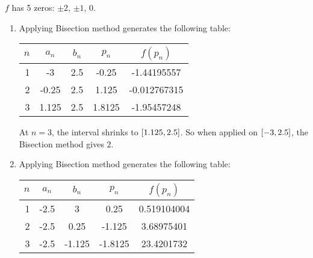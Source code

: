 \documentclass[../../Assignments.tex]{subfiles}
\begin{document}
\begin{solution}
    \(f\) has 5 zeros: \(\pm 2\), \(\pm 1\), \(0\).

    \begin{enumerate}[label = (\alph*)]
        \item Applying Bisection method generates the following table:

            \begin{table}[H]
                \centering
                \begin{tabular}{r S[table-format=-1.3] S[table-format=1.1] S[table-format=-1.4] S[table-format=-1.9]}
                    \toprule
                    \(n\)  &   {\(a_n\)}   &   {\(b_n\)}   &   {\(p_n\)}   &  {\(f(p_n)\)}  \\
                      &  -3           &  2.5          &  -0.25        &  -1.44195557   \\
                        2  &  -0.25        &  2.5          &   1.125       &  -0.012767315  \\
                        3  &   1.125       &  2.5          &   1.8125      &  -1.95457248   \\
                    \bottomrule
                \end{tabular}
            \end{table}

            At \(n = 3\), the interval shrinks to
            \(\interval{\num{1.125}}{\num{2.5}}\). So when applied on
            \(\interval{-3}{\num{2.5}}\), the Bisection method gives \(2\).

        \item Applying Bisection method generates the following table:

            \begin{table}[H]
                \centering
                \begin{tabular}{r S[table-format=-1.1] S[table-format=-1.3] S[table-format=-1.4] S[table-format=2.9]}
                    \toprule
                    \(n\)  &   {\(a_n\)}   &   {\(b_n\)}   &   {\(p_n\)}   &  {\(f(p_n)\)}  \\
                      &  -2.5         &   3           &   0.25        &    0.519104004 \\
                        2  &  -2.5         &   0.25        &  -1.125       &    3.68975401  \\
                        3  &  -2.5         &  -1.125       &  -1.8125      &   23.4201732   \\
                    \bottomrule
                \end{tabular}
            \end{table}


\end{enumerate}
\end{solution}
\end{document}
